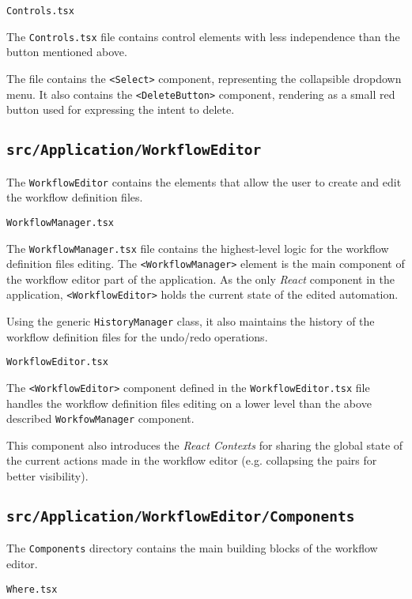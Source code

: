 \emptyline
\verb|Controls.tsx|
\smallskip

The \texttt{Controls.tsx} file contains control elements with less independence than the button mentioned above.

The file contains the \texttt{<Select>} component, representing the collapsible dropdown menu.
It also contains the \texttt{<DeleteButton>} component, rendering as a small red button used for expressing the intent to delete.

\clearpage
\subsection{\texttt{src/Application/WorkflowEditor}}

The \texttt{WorkflowEditor} contains the elements that allow the user to create and edit the workflow definition files.

\emptyline
\verb|WorkflowManager.tsx|
\smallskip

The \texttt{WorkflowManager.tsx} file contains the highest-level logic for the workflow definition files editing.
The \texttt{<WorkflowManager>} element is the main component of the workflow editor part of the application.
As the only \textit{React} component in the application, \texttt{<WorkflowEditor>} holds the current state of the edited automation.

Using the generic \texttt{HistoryManager} class, it also maintains the history of the workflow definition files for the undo/redo operations.

\emptyline
\verb|WorkflowEditor.tsx|
\smallskip

The \texttt{<WorkflowEditor>} component defined in the \texttt{WorkflowEditor.tsx} file handles the workflow definition files editing
on a lower level than the above described \texttt{WorkfowManager} component.

This component also introduces the \textit{React Contexts} for sharing the global state of the current actions made in the workflow editor 
(e.g. collapsing the pairs for better visibility).

\subsection{\texttt{src/Application/WorkflowEditor/Components}}

The \texttt{Components} directory contains the main building blocks of the workflow editor.

\emptyline
\verb|Where.tsx|
\smallskip

